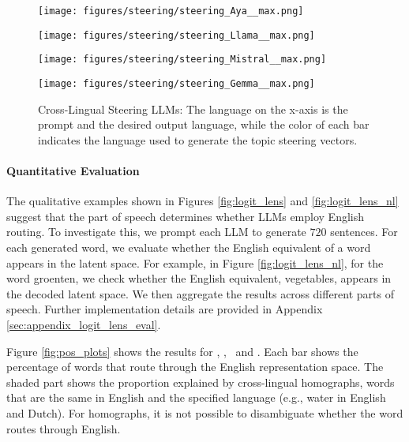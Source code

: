 \begin{figure*}[t]
    \begin{minipage}{0.49\textwidth}
    \centering
    \subcaption{\aya}
    \texttt{[image: figures/steering/steering\_Aya\_\_max.png]} 
    \end{minipage}
    \begin{minipage}{0.49\textwidth}
    \centering
    \subcaption{\llama}
    \texttt{[image: figures/steering/steering\_Llama\_\_max.png]} 
    \end{minipage}
    \begin{minipage}{0.49\textwidth}
    \centering
    \subcaption{\mistral }
    \texttt{[image: figures/steering/steering\_Mistral\_\_max.png]} 
    \end{minipage}
        \begin{minipage}{0.49\textwidth}
      \subcaption{\gemma }
    \texttt{[image: figures/steering/steering\_Gemma\_\_max.png]} 
    \end{minipage}
    \caption{Cross-Lingual Steering LLMs: The language on the x-axis is the prompt and the desired output language, while the color of each bar indicates the language used to generate the topic steering vectors.}
    \label{fig:steering}
\end{figure*}

\paragraph{Quantitative Evaluation}
The qualitative examples shown in Figures \ref{fig:logit_lens} and \ref{fig:logit_lens_nl} suggest that the part of speech determines whether LLMs employ English routing.
To investigate this, we prompt each LLM to generate $720$ sentences. For each generated word, we evaluate whether the English equivalent of a word appears in the latent space. 
For example, in Figure \ref{fig:logit_lens_nl}, for the word groenten, we check whether the English equivalent, vegetables, appears in the decoded latent space.
We then aggregate the results across different parts of speech. Further implementation details are provided in Appendix \ref{sec:appendix_logit_lens_eval}.

Figure \ref{fig:pos_plots} shows the results for \aya, \llama, \mistral \ and \gemma. Each bar shows the percentage of words that route through the English representation space. The shaded part shows the proportion explained by cross-lingual homographs, words that are the same in English and the specified language (e.g., water in English and Dutch). For homographs, it is not possible to disambiguate whether the word routes through English. 

